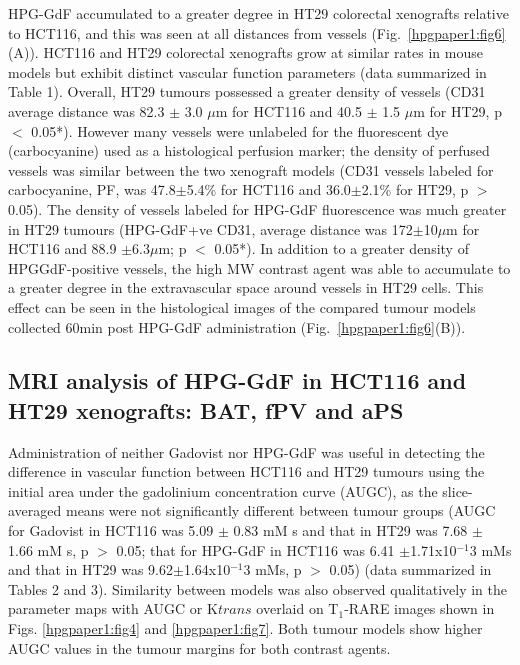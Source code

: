 HPG-GdF accumulated to a greater degree in HT29 colorectal xenografts relative to HCT116, and this was seen at all distances from vessels (Fig.~\ref{hpgpaper1:fig6}(A)).
HCT116 and HT29 colorectal xenografts grow at similar rates in mouse models but exhibit distinct vascular function parameters (data summarized in Table 1).
Overall, HT29 tumours possessed a greater density of vessels (\acs{CD31} average distance was 82.3 $\pm$ 3.0 $\mu$m for HCT116 and 40.5 $\pm$ 1.5 $\mu$m for HT29, p $<$ 0.05*).
However many vessels were unlabeled for the fluorescent dye (carbocyanine) used as a histological perfusion marker; the density of perfused vessels was similar between the two xenograft models (\acs{CD31} vessels labeled for carbocyanine, PF, was 47.8$\pm$5.4\% for HCT116 and 36.0$\pm$2.1\% for HT29, p $>$ 0.05).
The density of vessels labeled for \acs{HPG-GdF} fluorescence was much greater in HT29 tumours (HPG-GdF+ve \acs{CD31}, average distance was 172$\pm$10$\mu$m for HCT116 and 88.9 $\pm$6.3$\mu$m; p $<$ 0.05*).
In addition to a greater density of HPGGdF-positive vessels, the high \acs{MW} contrast agent was able to accumulate to a greater degree in the extravascular space around vessels in HT29 cells.
This effect can be seen in the histological images of the compared tumour models collected 60min post \acs{HPG-GdF} administration (Fig.~\ref{hpgpaper1:fig6}(B)).

\subsection{MRI analysis of \acs{HPG-GdF} in HCT116 and HT29 xenografts: \acs{BAT}, \acs{fPV} and aPS}

Administration of neither Gadovist nor \acs{HPG-GdF} was useful in detecting the difference in vascular function between HCT116 and HT29 tumours using the initial area under the gadolinium concentration curve (AUGC), as the slice-averaged means were not significantly different between tumour groups (AUGC for Gadovist in HCT116 was 5.09 $\pm$ 0.83 mM s and that in HT29 was 7.68 $\pm$ 1.66 mM s, p $>$ 0.05; that for \acs{HPG-GdF} in HCT116 was 6.41 $\pm$1.71x10$^{-1}$3 mMs and that in HT29 was 9.62$\pm$1.64x10$^{-1}$3 mMs, p $>$ 0.05) (data summarized in Tables 2 and 3).
Similarity between models was also observed qualitatively in the parameter maps with AUGC or K${trans}$ overlaid on T$_1$-RARE images shown in Figs.
\ref{hpgpaper1:fig4} and \ref{hpgpaper1:fig7}.
Both tumour models show higher AUGC values in the tumour margins for both contrast agents.

